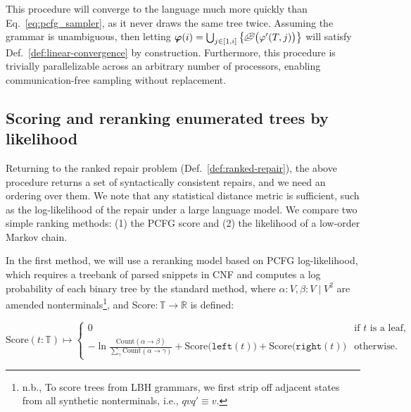 \documentclass[sigplan,acmsmall,nonacm,screen]{acmart}\settopmatter{printfolios=false,printccs=false,printacmref=false}
\begin{document}
  This procedure will converge to the language much more quickly than Eq.~\ref{eq:pcfg_sampler}, as it never draws the same tree twice. Assuming the grammar is unambiguous, then letting $\bm\varphi(i) = \bigcup_{j\in[1, i]} \big\{\text{\textleaf}\big(\varphi'(T, j)\big)\big\}$ will satisfy Def.~\ref{def:linear-convergence} by construction. Furthermore, this procedure is trivially parallelizable across an arbitrary number of processors, enabling communication-free sampling without replacement. %

\subsection{Scoring and reranking enumerated trees by likelihood}\label{sec:ranking}

Returning to the ranked repair problem (Def.~\ref{def:ranked-repair}), the above procedure returns a set of syntactically consistent repairs, and we need an ordering over them. We note that any statistical distance metric is sufficient, such as the log-likelihood of the repair under a large language model. We compare two simple ranking methods: (1) the PCFG score and (2) the likelihood of a low-order Markov chain.

In the first method, we will use a reranking model based on PCFG log-likelihood, which requires a treebank of parsed snippets in CNF and computes a log probability of each binary tree by the standard method, where $\alpha: V, \beta: V \mid V^2$ are amended nonterminals\footnote{n.b., To score trees from LBH grammars, we first strip off adjacent states from all synthetic nonterminals, i.e., $qvq' \equiv v$.}, and Score$: \mathbb{T} \rightarrow \mathbb{R}$ is defined:

\begin{equation}
\text{Score}(t: \mathbb{T}) \mapsto \begin{cases}
0 & \text{if $t$ is a leaf,} \\
-\ln\frac{\text{Count}(\alpha \rightarrow \beta)}{\sum_{\gamma}\text{Count}(\alpha \rightarrow \gamma)} + \text{Score}\big(\texttt{left}(t)\big) + \text{Score}\big(\texttt{right}(t)\big) & \text{otherwise.}
\end{cases}
\end{equation}
\end{document}
